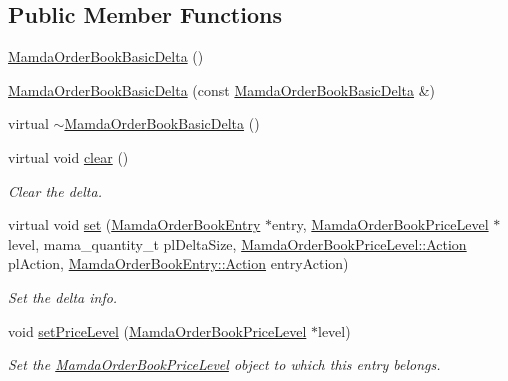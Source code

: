 \subsection*{Public Member Functions}
\begin{CompactItemize}
\item 
\hyperlink{classWombat_1_1MamdaOrderBookBasicDelta_1df71590f9c90f9b53c4e7873ee2ddfe}{Mamda\-Order\-Book\-Basic\-Delta} ()
\item 
\hyperlink{classWombat_1_1MamdaOrderBookBasicDelta_fc3c3d8060a8423abce7c3dbb104057f}{Mamda\-Order\-Book\-Basic\-Delta} (const \hyperlink{classWombat_1_1MamdaOrderBookBasicDelta}{Mamda\-Order\-Book\-Basic\-Delta} \&)
\item 
virtual \hyperlink{classWombat_1_1MamdaOrderBookBasicDelta_a286af598256857e898fd6ce033fbd18}{$\sim$Mamda\-Order\-Book\-Basic\-Delta} ()
\item 
virtual void \hyperlink{classWombat_1_1MamdaOrderBookBasicDelta_9cc22c9747cad413d8f6428231f6740c}{clear} ()
\begin{CompactList}\small\item\em Clear the delta. \item\end{CompactList}\item 
virtual void \hyperlink{classWombat_1_1MamdaOrderBookBasicDelta_7d5c8a70ea4d2d9acd4ff67426837a3c}{set} (\hyperlink{classWombat_1_1MamdaOrderBookEntry}{Mamda\-Order\-Book\-Entry} $\ast$entry, \hyperlink{classWombat_1_1MamdaOrderBookPriceLevel}{Mamda\-Order\-Book\-Price\-Level} $\ast$level, mama\_\-quantity\_\-t pl\-Delta\-Size, \hyperlink{classWombat_1_1MamdaOrderBookPriceLevel_bd3407b4250fc6f7a42d94b6d32e358a}{Mamda\-Order\-Book\-Price\-Level::Action} pl\-Action, \hyperlink{classWombat_1_1MamdaOrderBookEntry_fc6cb1d67c7601d093a36f59cf9bcef4}{Mamda\-Order\-Book\-Entry::Action} entry\-Action)
\begin{CompactList}\small\item\em Set the delta info. \item\end{CompactList}\item 
void \hyperlink{classWombat_1_1MamdaOrderBookBasicDelta_793e97408911d035d6f6c0b29f0ea152}{set\-Price\-Level} (\hyperlink{classWombat_1_1MamdaOrderBookPriceLevel}{Mamda\-Order\-Book\-Price\-Level} $\ast$level)
\begin{CompactList}\small\item\em Set the \hyperlink{classWombat_1_1MamdaOrderBookPriceLevel}{Mamda\-Order\-Book\-Price\-Level} object to which this entry belongs. \item\end{CompactList}\item 

\end{CompactItemize}
